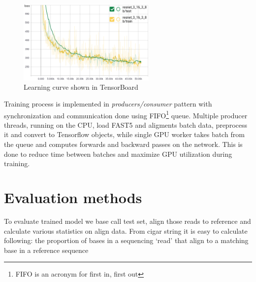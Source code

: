 \documentclass[times, utf8, diplomski, numeric, english]{fer}
\begin{document}
\begin{figure}[!ht]
	\begin{center}
		\includegraphics[width=0.6\textwidth]{./imgs/train_tb.png}
		\caption{Learning curve shown in TensorBoard}
		\label{fg:learn}
	\end{center}
\end{figure}

Training process is implemented in \textit{producers/consumer} pattern with synchronization and communication done using FIFO\footnote{FIFO is an acronym for first in, first out} queue. Multiple producer threads, running on the CPU, load FAST5 and aligments batch data, preprocess it and convert to Tensorflow objects, while single GPU worker takes batch from the queue and computes forwards and backward passes on the network. This is done to reduce time between batches and maximize GPU utilization during training. 









\section{Evaluation methods}
To evaluate trained model we base call test set, align those reads to reference and calculate various statistics on align data.
From cigar string it is easy to calculate following:
the proportion of bases in a sequencing ‘read’ that align to a matching base in a reference sequence
\end{document}
